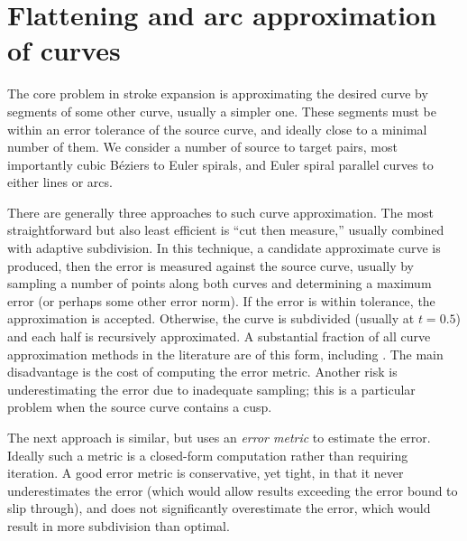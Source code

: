 \documentclass[sigconf, authordraft]{acmart}
\begin{document}
\section{Flattening and arc approximation of curves}


The core problem in stroke expansion is approximating the desired curve by segments of some other curve, usually a simpler one. These segments must be within an error tolerance of the source curve, and ideally close to a minimal number of them. We consider a number of source to target pairs, most importantly cubic Béziers to Euler spirals, and Euler spiral parallel curves to either lines or arcs.

There are generally three approaches to such curve approximation. The most straightforward but also least efficient is ``cut then measure,'' usually combined with adaptive subdivision. In this technique, a candidate approximate curve is produced, then the error is measured against the source curve, usually by sampling a number of points along both curves and determining a maximum error (or perhaps some other error norm). If the error is within tolerance, the approximation is accepted. Otherwise, the curve is subdivided (usually at $t = 0.5$) and each half is recursively approximated. A substantial fraction of all curve approximation methods in the literature are of this form, including \citet{Nehab2020}. The main disadvantage is the cost of computing the error metric. Another risk is underestimating the error due to inadequate sampling; this is a particular problem when the source curve contains a cusp.


The next approach is similar, but uses an \emph{error metric} to estimate the error. Ideally such a metric is a closed-form computation rather than requiring iteration. A good error metric is conservative, yet tight, in that it never underestimates the error (which would allow results exceeding the error bound to slip through), and does not significantly overestimate the error, which would result in more subdivision than optimal.
\end{document}
